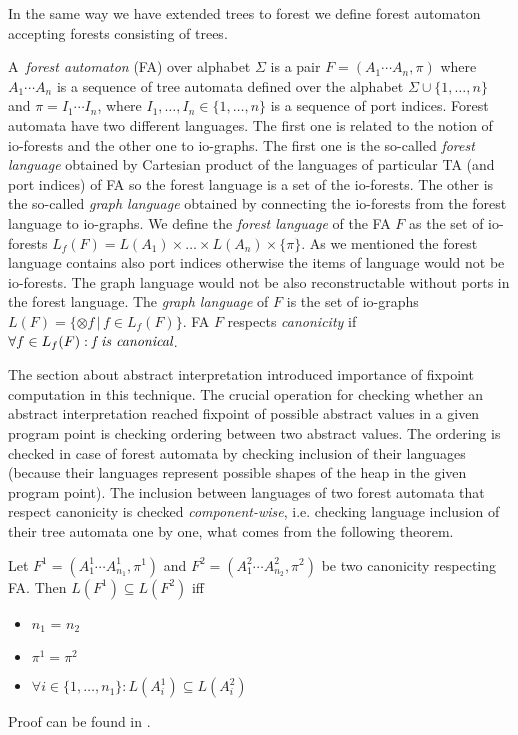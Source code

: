 \documentclass[a4paper, 12pt]{article}
\begin{document}
In the same way we have extended trees to forest we define forest automaton
accepting forests consisting of trees.

A~\emph{forest automaton} (FA) over alphabet $\Sigma$ is a pair $F=(A_1\cdots A_n, \pi)$
where $A_1 \cdots A_n$ is a sequence of tree automata defined over the alphabet $\Sigma \cup \{1,\ldots,n\}$
and $\pi = I_1 \cdots I_n$, where $I_1,\ldots, I_n \in \{1, \ldots, n\}$ is a sequence of port indices.
Forest automata have two different languages.
The first one is related to the notion of io-forests and the other one to io-graphs.
The first one is the so-called \emph{forest language} obtained by Cartesian product of the languages of particular TA (and port indices) of FA
so the forest language is a set of the io-forests.
The other is the so-called \emph{graph language} obtained by connecting the io-forests from the forest language to io-graphs.
We define the \emph{forest language} of the FA $F$ as the set of io-forests $L_f(F)= L(A_1) \times \ldots \times L(A_n) \times \{\pi\}$.
As we mentioned the forest language contains also port indices otherwise the items of language would not be io-forests.
The graph language would not be also reconstructable without ports in the forest language.
The \emph{graph language} of $F$ is the set of io-graphs $L(F) = \{\otimes f\,|\, f \in L_f(F)\}$.
FA $F$ respects \emph{canonicity} if $\forall f \in L_f(F): \emph{f is canonical}$.

The section about abstract interpretation introduced importance of fixpoint
computation in this technique.
The crucial operation for checking whether an abstract interpretation
reached fixpoint of possible abstract values in a given program point is
checking ordering between two abstract values.
The ordering is checked in case of forest automata by checking
inclusion of their languages (because their languages represent
possible shapes of the heap in the given program point).
The inclusion between languages of two forest automata that respect canonicity 
is checked \emph{component-wise},
i.e. checking language inclusion of their tree automata one by one,
what comes from the following theorem.

	Let $F^1 = (A_1^1\cdots A_{n_{1}}^1, \pi^1)$ and $F^2 = (A_1^2\cdots A_{n_{2}}^2, \pi^2)$
	be two canonicity respecting FA.
	Then $L(F^1) \subseteq L(F^2)$ iff
	\begin{itemize}
			\item $n_1$ = $n_2$
			\item $\pi^1 = \pi^2$
			\item $\forall i \in \{1,\ldots,n_1\}: L(A_i^1) \subseteq L(A_i^2)$
	\end{itemize}
Proof can be found in \cite{forester:techrep}.
\end{document}
